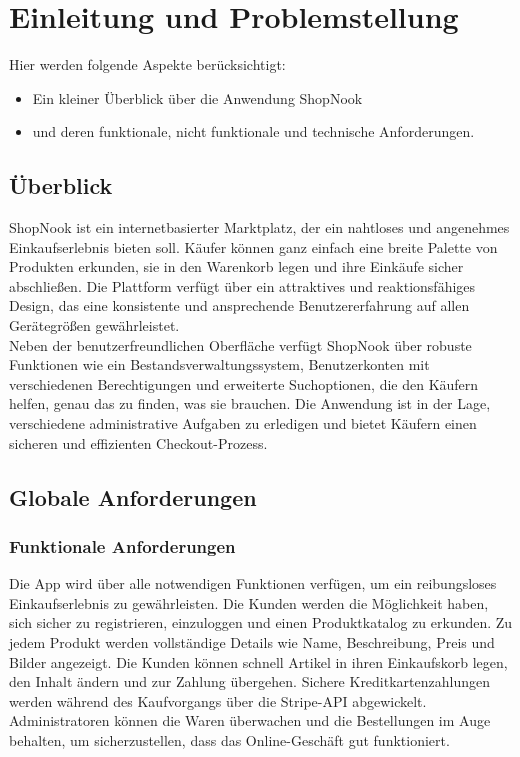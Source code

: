 \chapter{Einleitung und Problemstellung}


Hier werden folgende Aspekte berücksichtigt: 


\begin{itemize}
	\item Ein kleiner Überblick über die Anwendung ShopNook
	\item und deren funktionale, nicht funktionale und technische Anforderungen.
\end{itemize}

\section{Überblick}

ShopNook ist ein internetbasierter Marktplatz, der ein nahtloses und angenehmes Einkaufserlebnis bieten soll. Käufer können ganz einfach eine breite Palette von Produkten erkunden, sie in den Warenkorb legen und ihre Einkäufe sicher abschließen. Die Plattform verfügt über ein attraktives und reaktionsfähiges Design, das eine konsistente und ansprechende Benutzererfahrung auf allen Gerätegrößen gewährleistet.\\
Neben der benutzerfreundlichen Oberfläche verfügt ShopNook über robuste Funktionen wie ein Bestandsverwaltungssystem, Benutzerkonten mit verschiedenen Berechtigungen und erweiterte Suchoptionen, die den Käufern helfen, genau das zu finden, was sie brauchen. Die Anwendung ist in der Lage, verschiedene administrative Aufgaben zu erledigen und bietet Käufern einen sicheren und effizienten Checkout-Prozess.

\section{Globale Anforderungen}

\subsection{Funktionale Anforderungen}

Die App wird über alle notwendigen Funktionen verfügen, um ein reibungsloses Einkaufserlebnis zu gewährleisten. Die Kunden werden die Möglichkeit haben, sich sicher zu registrieren, einzuloggen und einen Produktkatalog zu erkunden. Zu jedem Produkt werden vollständige Details wie Name, Beschreibung, Preis und Bilder angezeigt. Die Kunden können schnell Artikel in ihren Einkaufskorb legen, den Inhalt ändern und zur Zahlung übergehen. Sichere Kreditkartenzahlungen werden während des Kaufvorgangs über die Stripe-API abgewickelt. Administratoren können die Waren überwachen und die Bestellungen im Auge behalten, um sicherzustellen, dass das Online-Geschäft gut funktioniert. 

